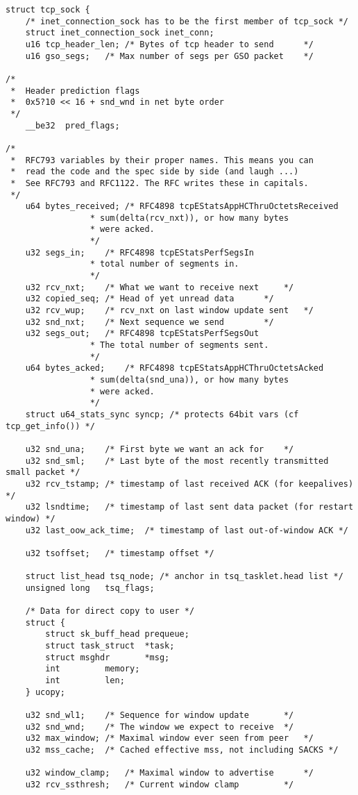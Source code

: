 \documentclass[11pt, a4paper,oneside]{book}
\theoremstyle{ocrenumbox}
\theoremstyle{purplenumbox}
\theoremstyle{blackbox}
\begin{document}
\begin{verbatim}
struct tcp_sock {
	/* inet_connection_sock has to be the first member of tcp_sock */
	struct inet_connection_sock	inet_conn;
	u16	tcp_header_len;	/* Bytes of tcp header to send		*/
	u16	gso_segs;	/* Max number of segs per GSO packet	*/

/*
 *	Header prediction flags
 *	0x5?10 << 16 + snd_wnd in net byte order
 */
	__be32	pred_flags;

/*
 *	RFC793 variables by their proper names. This means you can
 *	read the code and the spec side by side (and laugh ...)
 *	See RFC793 and RFC1122. The RFC writes these in capitals.
 */
	u64	bytes_received;	/* RFC4898 tcpEStatsAppHCThruOctetsReceived
				 * sum(delta(rcv_nxt)), or how many bytes
				 * were acked.
				 */
	u32	segs_in;	/* RFC4898 tcpEStatsPerfSegsIn
				 * total number of segments in.
				 */
 	u32	rcv_nxt;	/* What we want to receive next 	*/
	u32	copied_seq;	/* Head of yet unread data		*/
	u32	rcv_wup;	/* rcv_nxt on last window update sent	*/
 	u32	snd_nxt;	/* Next sequence we send		*/
	u32	segs_out;	/* RFC4898 tcpEStatsPerfSegsOut
				 * The total number of segments sent.
				 */
	u64	bytes_acked;	/* RFC4898 tcpEStatsAppHCThruOctetsAcked
				 * sum(delta(snd_una)), or how many bytes
				 * were acked.
				 */
	struct u64_stats_sync syncp; /* protects 64bit vars (cf tcp_get_info()) */

 	u32	snd_una;	/* First byte we want an ack for	*/
 	u32	snd_sml;	/* Last byte of the most recently transmitted small packet */
	u32	rcv_tstamp;	/* timestamp of last received ACK (for keepalives) */
	u32	lsndtime;	/* timestamp of last sent data packet (for restart window) */
	u32	last_oow_ack_time;  /* timestamp of last out-of-window ACK */

	u32	tsoffset;	/* timestamp offset */

	struct list_head tsq_node; /* anchor in tsq_tasklet.head list */
	unsigned long	tsq_flags;

	/* Data for direct copy to user */
	struct {
		struct sk_buff_head	prequeue;
		struct task_struct	*task;
		struct msghdr		*msg;
		int			memory;
		int			len;
	} ucopy;

	u32	snd_wl1;	/* Sequence for window update		*/
	u32	snd_wnd;	/* The window we expect to receive	*/
	u32	max_window;	/* Maximal window ever seen from peer	*/
	u32	mss_cache;	/* Cached effective mss, not including SACKS */

	u32	window_clamp;	/* Maximal window to advertise		*/
	u32	rcv_ssthresh;	/* Current window clamp			*/


\end{verbatim}
\end{document}
